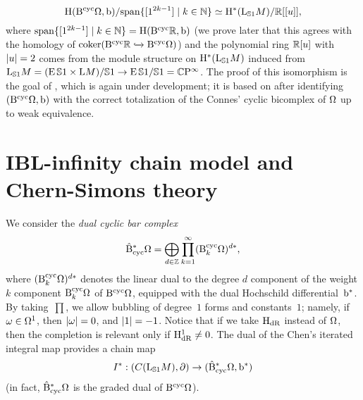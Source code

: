 \documentclass[\MainFolder/Text.tex]{subfiles}
\begin{document}
\begin{equation}\label{Eq:IsomKai}
\mathrm{H}(\mathrm{B}^{\mathrm{cyc}} \Omega,\mathrm{b})/\mathrm{span}\{[1^{2k-1}]\mid k\in\mathbb{N}\} \simeq \mathrm{H}^*(\mathrm{L}_{\mathbb{S}{1}} M)/\mathbb{R}[[u]],
\end{equation}
where $\mathrm{span}\{[1^{2k-1}]\mid k\in\mathbb{N}\} = \mathrm{H}(\mathrm{B}^{\mathrm{cyc}} \mathbb{R},\mathrm{b})$ (we prove later that this agrees with the homology of $\operatorname{\mathrm{coker}}(\mathrm{B}^{\mathrm{cyc}} \mathbb{R} \xhookrightarrow{} \mathrm{B}^{\mathrm{cyc}} \Omega)$) and the polynomial ring $\mathbb{R}[u]$ with $|u| = 2$ comes from the module structure on $\mathrm{H}^*(\mathrm{L}_{\mathbb{S}{1}} M)$ induced from $\mathrm{L}_{\mathbb{S}{1}} M = (\operatorname{E} \mathbb{S}{1} \times \mathrm{L} M)/\mathbb{S}{1} \rightarrow \operatorname{E}\mathbb{S}{1}/\mathbb{S}{1} = \mathbb{C}\mathrm{P}^{\infty}$. The proof of this isomorphism is the goal of \cite{Cieliebak2018b}, which is again under development; it is based on \cite{Getzler} after identifying $(\mathrm{B}^{\mathrm{cyc}} \Omega,\mathrm{b})$ with the correct totalization of the Connes' cyclic bicomplex of $\Omega$ up to weak equivalence.

\section{IBL-infinity chain model and Chern-Simons theory}

We consider the \emph{dual cyclic bar complex}
$$ \hat{\mathrm{B}}_{\mathrm{cyc}}^* \Omega = \bigoplus_{d\in\mathbb{Z}} \prod_{k=1}^\infty (\mathrm{B}^{\mathrm{cyc}}_k \Omega)^{d*}, $$
where $(\mathrm{B}^{\mathrm{cyc}}_k \Omega)^{d*}$ denotes the linear dual to the degree $d$ component of the weight $k$ component $\mathrm{B}^{\mathrm{cyc}}_k \Omega$ of $\mathrm{B}^{\mathrm{cyc}} \Omega$, equipped with the dual Hochschild differential~$\mathrm{b}^*$. By taking~$\prod$, we allow bubbling of degree~$1$ forms and constants~$1$; namely, if $\omega\in \Omega^1$, then $|\omega| = 0$, and $|1| = -1$. Notice that if we take $\mathrm{H}_{\mathrm{dR}}$ instead of $\Omega$, then the completion is relevant only if $\mathrm{H}_{\mathrm{dR}}^1 \neq 0$. The dual of the Chen's iterated integral map provides a chain map 
$$I^*: (C(\mathrm{L}_{\mathbb{S}{1}} M),\partial) \rightarrow (\hat{\mathrm{B}}_{\mathrm{cyc}}^*\Omega,\mathrm{b}^*) $$
(in fact, $ \hat{\mathrm{B}}_{\mathrm{cyc}}^* \Omega$ is the graded dual of $\mathrm{B}^{\mathrm{cyc}} \Omega$).
\end{document}
